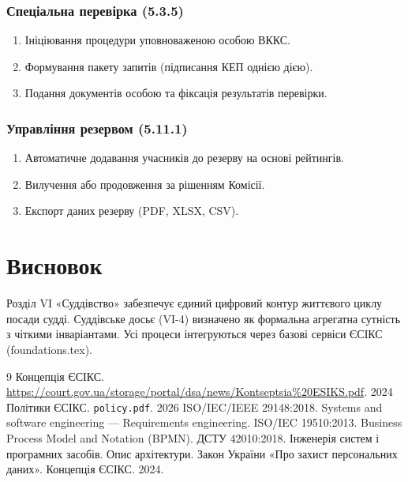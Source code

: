 \documentclass{article}
\begin{document}
\subsubsection{Спеціальна перевірка (5.3.5)}
\begin{enumerate}
    \item Ініціювання процедури уповноваженою особою ВККС.
    \item Формування пакету запитів (підписання КЕП однією дією).
    \item Подання документів особою та фіксація результатів перевірки.
\end{enumerate}

\subsubsection{Управління резервом (5.11.1)}
\begin{enumerate}
    \item Автоматичне додавання учасників до резерву на основі рейтингів.
    \item Вилучення або продовження за рішенням Комісії.
    \item Експорт даних резерву (PDF, XLSX, CSV).
\end{enumerate}

\newpage
\section*{Висновок}

Розділ VI «Суддівство» забезпечує єдиний цифровий контур життєвого циклу посади судді. Суддівське досьє (VI-4) визначено як формальна агрегатна сутність з чіткими інваріантами. Усі процеси інтегруються через базові сервіси ЄСІКС (foundations.tex).

\begin{thebibliography}{9}
 Концепція ЄСІКС. \url{https://court.gov.ua/storage/portal/dsa/news/Kontseptsia%20ESIKS.pdf}. 2024
 Політики ЄСІКС. \texttt{policy.pdf}. 2026
 ISO/IEC/IEEE 29148:2018. Systems and software engineering — Requirements engineering.
 ISO/IEC 19510:2013. Business Process Model and Notation (BPMN).
 ДСТУ 42010:2018. \newblock Інженерія систем і програмних засобів. Опис архітектури.
 Закон України «Про захист персональних даних».
 Концепція ЄСІКС. 2024.
\end{thebibliography}
\end{document}
